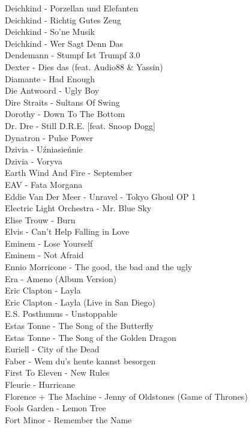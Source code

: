Deichkind - Porzellan und Elefanten\\
Deichkind - Richtig Gutes Zeug\\
Deichkind - So'ne Musik\\
Deichkind - Wer Sagt Denn Das\\
Dendemann - Stumpf Ist Trumpf 3.0\\
Dexter - Dies das (feat. Audio88 \& Yassin)\\
Diamante - Had Enough\\
Die Antwoord - Ugly Boy\\
Dire Straits - Sultans Of Swing\\
Dorothy - Down To The Bottom\\
Dr. Dre - Still D.R.E. [feat. Snoop Dogg]\\
Dynatron - Pulse Power\\
Dzivia - Uźniasieńnie\\
Dzivia - Voryva\\
Earth Wind And Fire - September\\
EAV - Fata Morgana\\
Eddie Van Der Meer - Unravel - Tokyo Ghoul OP 1\\
Electric Light Orchestra - Mr. Blue Sky\\
Elise Trouw - Burn\\
Elvis - Can't Help Falling in Love\\
Eminem - Lose Yourself\\
Eminem - Not Afraid\\
Ennio Morricone - The good, the bad and the ugly\\
Era - Ameno (Album Version)\\
Eric Clapton - Layla\\
Eric Clapton - Layla (Live in San Diego)\\
E.S. Posthumus - Unstoppable\\
Estas Tonne - The Song of the Butterfly\\
Estas Tonne - The Song of the Golden Dragon\\
Euriell - City of the Dead\\
Faber - Wem du's heute kannst besorgen\\
First To Eleven - New Rules\\
Fleurie - Hurricane\\
Florence + The Machine - Jenny of Oldstones (Game of Thrones)\\
Fools Garden - Lemon Tree\\
Fort Minor - Remember the Name\\
